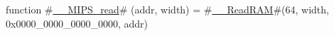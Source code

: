 function #\hyperref[sailMIPSzzyzyMIPSzyread]{\_\_MIPS\_read}# (addr, width) = #\hyperref[sailMIPSzzyzyReadRAM]{\_\_ReadRAM}#(64, width, 0x0000_0000_0000_0000, addr)
